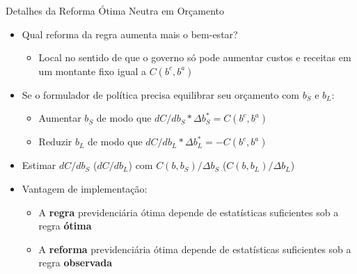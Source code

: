 \begin{frame}[label=optimalDetails]{Detalhes da Reforma Ótima Neutra em Orçamento}
    \begin{itemize}
        \item Qual reforma da regra aumenta mais o bem-estar?
        \begin{itemize}
            \item Local no sentido de que o governo só pode aumentar custos e receitas em um montante fixo igual a $C(b^c,b^a)$
        \end{itemize}
        \item Se o formulador de política precisa equilibrar seu orçamento com $b_S$ e $b_L$:
        \begin{itemize}
            \item Aumentar $b_S$ de modo que $dC/db_S * \Delta b_S^* = C(b^c,b^a)$
            \item Reduzir $b_L$ de modo que $dC/db_L * \Delta b_L^* = -C(b^c,b^a)$
        \end{itemize}
        \item Estimar $dC/db_S$ ($dC/db_L$) com $C(b,b_S)/\Delta b_S$ ($C(b,b_L)/\Delta b_L$)
        \item Vantagem de implementação:
        \begin{itemize}
            \item A \textbf{regra} previdenciária ótima depende de estatísticas suficientes sob a regra \textbf{ótima}
            \item A \textbf{reforma} previdenciária ótima depende de estatísticas suficientes sob a regra \textbf{observada}
        \end{itemize}
    \end{itemize}
\end{frame}


